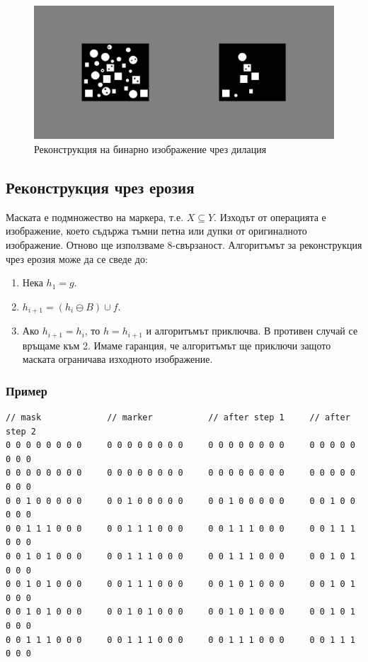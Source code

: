 \documentclass[fleqn,12pt]{article}
\begin{document}
\begin{figure}
    \centering
    \includegraphics[width=\textwidth]{img/dil_rec.jpg}
    \caption{Реконструкция на бинарно изображение чрез дилация}
    \label{fig:dil_rec}
\end{figure}


\subsection{Реконструкция чрез ерозия}

Маската е подмножество на маркера, т.е. $X \subseteq Y$. Изходът от операцията е изображение, което съдържа тъмни петна или дупки от оригиналното изображение. Отново ще използваме 8-свързаност. Алгоритъмът за реконструкция чрез ерозия може да се сведе до:
\begin{enumerate}
    \item Нека $h_1 = g$.
    \item $h_{i+1} = (h_{i} \ominus B) \cup f$.
    \item Ако $h_{i+1} = h_i$, то $h = h_{i+1}$ и алгоритъмът приключва. В противен случай се връщаме към 2. Имаме гаранция, че алгоритъмът ще приключи защото маската ограничава изходното изображение.
\end{enumerate}

\subsubsection{Пример}

\begin{lstlisting}[caption=Example for reconstruction based on dilation]
// mask             // marker           // after step 1     // after step 2
0 0 0 0 0 0 0 0     0 0 0 0 0 0 0 0     0 0 0 0 0 0 0 0     0 0 0 0 0 0 0 0
0 0 0 0 0 0 0 0     0 0 0 0 0 0 0 0     0 0 0 0 0 0 0 0     0 0 0 0 0 0 0 0
0 0 1 0 0 0 0 0     0 0 1 0 0 0 0 0     0 0 1 0 0 0 0 0     0 0 1 0 0 0 0 0 
0 0 1 1 1 0 0 0     0 0 1 1 1 0 0 0     0 0 1 1 1 0 0 0     0 0 1 1 1 0 0 0
0 0 1 0 1 0 0 0     0 0 1 1 1 0 0 0     0 0 1 1 1 0 0 0     0 0 1 0 1 0 0 0
0 0 1 0 1 0 0 0     0 0 1 1 1 0 0 0     0 0 1 0 1 0 0 0     0 0 1 0 1 0 0 0
0 0 1 0 1 0 0 0     0 0 1 0 1 0 0 0     0 0 1 0 1 0 0 0     0 0 1 0 1 0 0 0
0 0 1 1 1 0 0 0     0 0 1 1 1 0 0 0     0 0 1 1 1 0 0 0     0 0 1 1 1 0 0 0
\end{lstlisting}
\end{document}
